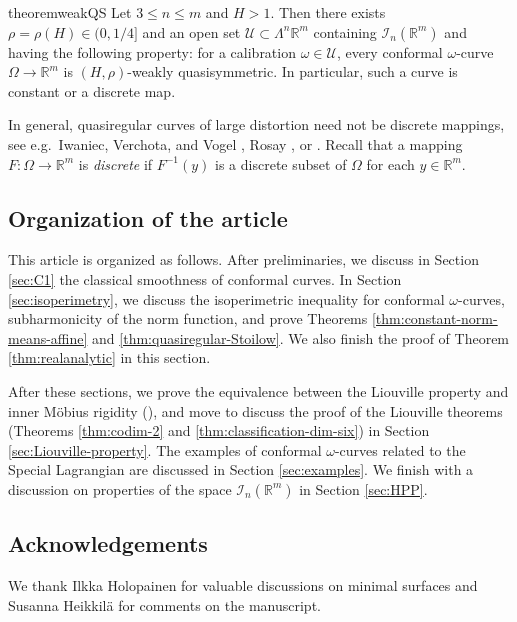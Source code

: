 \documentclass[a4paper,leqno,11pt]{amsart}
\numberwithin{equation}{section}
\theoremstyle{remark}
\theoremstyle{remark}
\newcommand{\R}{\mathbb{R}}
\begin{document}
\begin{restatable}{theorem}{weakQS}\label{thm:localinjec}
Let $3 \leq n \leq m$ and $H>1$. Then there exists $\rho = \rho(H) \in ( 0, 1/4 ]$ and an open set $\mathcal{U} \subset \Lambda^n \R^m$ containing $\mathcal{I}_{n}( \R^m )$ and having the following property: for a calibration $\omega \in \mathcal U$, every conformal $\omega$-curve $\Omega\to \R^m$ is $( H, \rho )$-weakly quasisymmetric. In particular, such a curve is constant or a discrete map.
\end{restatable}

In general, quasiregular curves of large distortion need not be discrete mappings, see e.g.~Iwaniec, Verchota, and Vogel \cite{Iwa:Ver:Vog:02}, Rosay \cite{Ros:10}, or \cite[Sections 2 and 3]{Hei:Pan:Pry:23}. Recall that a mapping $F\colon \Omega \to \R^m$ is \emph{discrete} if $F^{-1}(y)$ is a discrete subset of $\Omega$ for each $y\in \R^m$. 


\subsection*{Organization of the article}

This article is organized as follows. After preliminaries, we discuss in Section \ref{sec:C1} the classical smoothness of conformal curves. In Section \ref{sec:isoperimetry}, we discuss the isoperimetric inequality for conformal $\omega$-curves, subharmonicity of the norm function, and prove Theorems \ref{thm:constant-norm-means-affine} and \ref{thm:quasiregular-Stoilow}. We also finish the proof of Theorem \ref{thm:realanalytic} in this section.

After these sections, we prove the equivalence between the Liouville property and inner Möbius rigidity (), and move to discuss the proof of the Liouville theorems (Theorems \ref{thm:codim-2} and \ref{thm:classification-dim-six}) in Section \ref{sec:Liouville-property}. The examples of conformal $\omega$-curves related to the Special Lagrangian are discussed in Section \ref{sec:examples}. We finish with a discussion on properties of the space $\mathcal{I}_n(\R^m)$ in Section \ref{sec:HPP}.



\subsection*{Acknowledgements}

We thank Ilkka Holopainen for valuable discussions on minimal surfaces and Susanna Heikkil\"a for comments on the manuscript.
\end{document}
